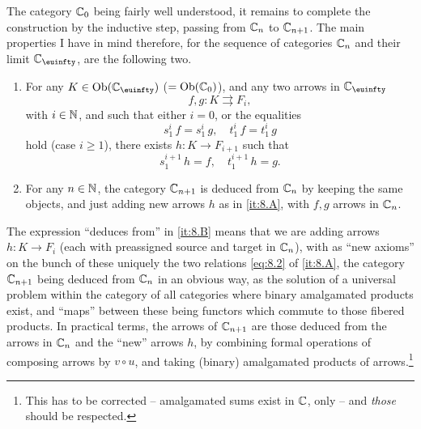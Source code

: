 \label{sec:9}%
The category ${\mathbb{C}}_0$ being fairly well understood, it remains to
complete the construction by the inductive step, passing from ${\mathbb{C}}_n$
to ${\mathbb{C}}_{n+1}$. The main properties I have in mind therefore, for the
sequence of categories ${\mathbb{C}}_n$ and their limit $\bC_\oo$, are the
following two.
\begin{enumerate}[label=(\Alph*)]
\item\label{it:8.A} For any $K\in\Ob(\bC_\oo)$ ($=\operatorname{Ob}({\mathbb{C}}_0)$), and any two
  arrows in $\bC_\oo$
  \[ f,g : K \rightrightarrows F_i,\]
  with $i\in{\ensuremath{\mathbb{N}}}$, and such that either $i=0$, or the equalities
  \begin{equation}\label{eq:8.1}
    s_1^i\, f = s_1^i\, g , \quad
    t_1^i\, f = t_1^i\, g\tag{1}
  \end{equation}
  hold (case $i\ge1$), there exists $h : K \to F_{i+1}$ such that
  \begin{equation}\label{eq:8.2}
    s_1^{i+1}\, h = f, \quad
    t_1^{i+1}\, h = g.\tag{2}
  \end{equation}
\item\label{it:8.B}
  For any $n\in{\ensuremath{\mathbb{N}}}$, the category ${\mathbb{C}}_{n+1}$ is deduced from ${\mathbb{C}}_n$
  by keeping the same objects, and just adding new arrows $h$ as
  in \ref{it:8.A}, with $f,g$ arrows in ${\mathbb{C}}_n$.
\end{enumerate}
The expression ``deduces from'' in \ref{it:8.B} means that we are
adding arrows $h: K\to F_i$ (each with preassigned source and target
in ${\mathbb{C}}_n$), with as ``new axioms'' on the bunch of these uniquely
the two relations \eqref{eq:8.2} of \ref{it:8.A}, the category ${\mathbb{C}}_{n+1}$
being deduced from ${\mathbb{C}}_n$ in an obvious way, as the solution of a
universal problem within the category of all categories where binary
amalgamated products exist, and ``maps'' between these being functors
which commute to those fibered products. In practical terms, the
arrows of ${\mathbb{C}}_{n+1}$ are those deduced from the arrows in ${\mathbb{C}}_n$ and
the ``new'' arrows $h$, by combining formal operations of
composing arrows by $v \circ u$, and taking (binary) amalgamated
products of arrows.\footnote{This has to be corrected -- amalgamated
  sums exist in ${\mathbb{C}}$, only -- and \emph{those} should be
  respected.}

